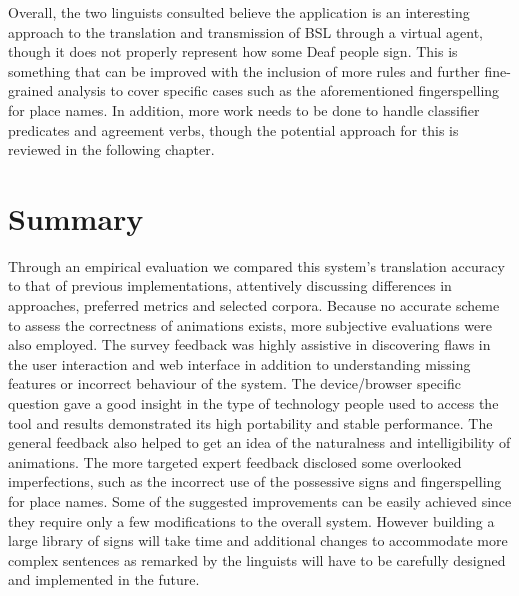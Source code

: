 \documentclass[12pt]{ociamthesis}  %
\begin{document}
Overall, the two linguists consulted believe the application is an interesting approach to the translation and transmission of BSL through a virtual agent, though it does not properly represent how some Deaf people sign. This is something that can be improved with the inclusion of more rules and further fine-grained analysis to cover specific cases such as the aforementioned fingerspelling for place names. In addition, more work needs to be done to handle classifier predicates and agreement verbs, though the potential approach for this is reviewed in the following chapter.

\section{Summary}
Through an empirical evaluation we compared this system's translation accuracy to that of previous implementations, attentively discussing differences in approaches, preferred metrics and selected corpora. Because no accurate scheme to assess the correctness of animations exists, more subjective evaluations were also employed. The survey feedback was highly assistive in discovering flaws in the user interaction and web interface in addition to understanding missing features or incorrect behaviour of the system. The device/browser specific question gave a good insight in the type of technology people used to access the tool and results demonstrated its high portability and stable performance. The general feedback also helped to get an idea of the naturalness and intelligibility of animations. The more targeted expert feedback disclosed some overlooked imperfections, such as the incorrect use of the possessive signs and fingerspelling for place names. Some of the suggested improvements can be easily achieved since they require only a few modifications to the overall system. However building a large library of signs will take time and additional changes to accommodate more complex sentences as remarked by the linguists will have to be carefully designed and implemented in the future.

\end{document}
